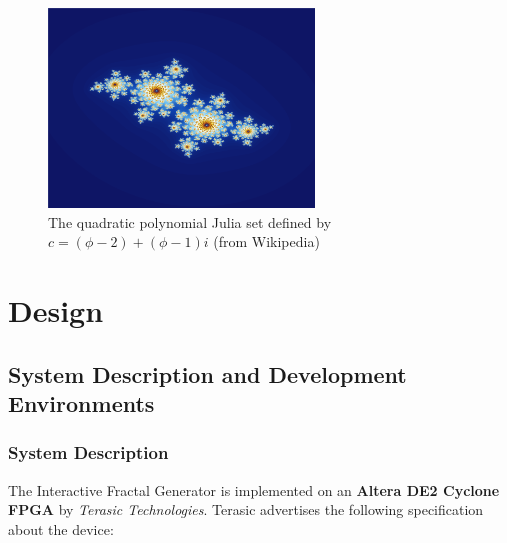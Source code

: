 \documentclass{article}
\begin{document}
\begin{figure}[H]
  \centering
	\includegraphics[width=200pt]{images/julia_wiki.png}
  \caption{The quadratic polynomial Julia set defined by \\$c=(\phi - 2)+(\phi - 1)i$ (from Wikipedia)}
\end{figure}

\section{Design}

\subsection{System Description and Development Environments}
\subsubsection{System Description}

The Interactive Fractal Generator is implemented on an \textbf{Altera DE2 Cyclone FPGA} by \textit{Terasic Technologies}. Terasic advertises the following specification about the device:
\end{document}
